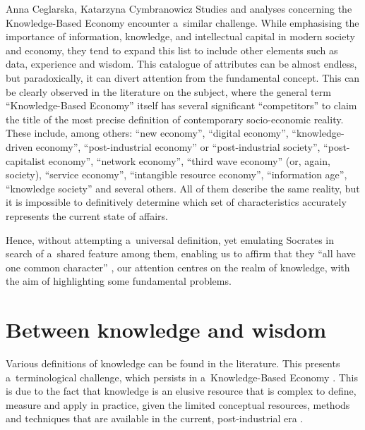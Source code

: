 \begin{artengenv2auth}{Anna Ceglarska, Katarzyna Cymbranowicz}
 Studies and analyses concerning the Knowledge-Based Economy encounter a~similar challenge. While emphasising the importance of information, knowledge, and intellectual capital in modern society and economy, they tend to expand this list to include other elements such as data, experience and wisdom. This catalogue of attributes can be almost endless, but paradoxically, it can divert attention from the fundamental concept. This can be clearly observed in the literature on the subject, where the general term ``Knowledge-Based Economy'' itself has several significant ``competitors'' to claim the title of the most precise definition of contemporary socio-economic reality. These include, among others: ``new economy'', ``digital economy'', ``knowledge-driven economy'', ``post-industrial economy'' or ``post-industrial society'', ``post-capitalist economy'', ``network economy'', ``third wave economy'' (or, again, society), ``service economy'', ``intangible resource economy'', ``information age'', ``knowledge society'' and several others. All of them describe the same reality, but it is impossible to definitively determine which set of characteristics accurately represents the current state of affairs.



Hence, without attempting a~universal definition, yet emulating Socrates in search of a~shared feature among them, enabling us to affirm that they ``all have one common character'' 
\parencite[][72c]{plato_plato_1967}, %
 our attention centres on the realm of knowledge, with the aim of highlighting some fundamental problems.



\section{Between knowledge and wisdom}

Various definitions of knowledge can be found in the literature. This presents a~terminological challenge, which persists in a~Knowledge-Based Economy 
\parencites[][]{teece_knowledge_1987}[][]{oecd_knowledge_2000}. %
 This is due to the fact that knowledge is an elusive resource that is complex to define, measure and apply in practice, given the limited conceptual resources, methods and techniques that are available in the current, post-industrial era 
\parencite[][p.20]{strojny_zarzadzanie_2000}.%





\end{artengenv2auth}
